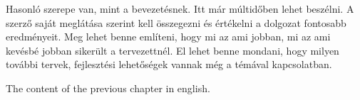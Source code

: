 
Hasonló szerepe van, mint a bevezetésnek.
Itt már múltidőben lehet beszélni.
A szerző saját meglátása szerint kell összegezni és értékelni a dolgozat fontosabb eredményeit.
Meg lehet benne említeni, hogy mi az ami jobban, mi az ami kevésbé jobban sikerült a tervezettnél.
El lehet benne mondani, hogy milyen további tervek, fejlesztési lehetőségek vannak még a témával kapcsolatban.


The content of the previous chapter in english.
